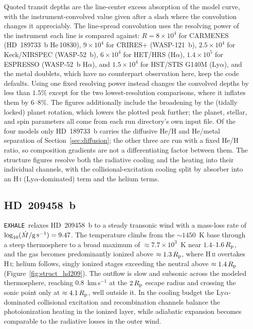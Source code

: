 \documentclass[twocolumn]{aastex702}
\newcommand{\EXHALE}{\texttt{EXHALE}}
\newcommand{\Rp}{R_{\rm p}}
\newcommand{\Mdot}{\dot{M}}
\newcommand{\Lya}{\mbox{Ly}\ensuremath{\alpha}}
\newcommand{\Ha}{\mbox{H}\ensuremath{\alpha}}
\begin{document}
Quoted transit depths are the line-center excess absorption of the model curve, with the
instrument-convolved value given after a slash where the convolution changes it
appreciably. The line-spread convolution uses the resolving power of the instrument each
line is compared against: $R=8\times10^{4}$ for CARMENES (HD~189733~b
\mbox{He\,10830}), $9\times10^{4}$ for CRIRES$+$ (WASP-121~b), $2.5\times10^{4}$ for
Keck/NIRSPEC (WASP-52~b), $6\times10^{4}$ for HET/HRS (\Ha), $1.4\times10^{5}$ for
ESPRESSO (WASP-52~b \Ha), and $1.5\times10^{4}$ for HST/STIS G140M (\Lya), and the
metal doublets, which have no counterpart observation here, keep the code defaults. Using
one fixed resolving power instead changes the convolved depths by less than $1.5\%$
except for the two lowest-resolution comparisons, where it inflates them by $6$--$8\%$.
The figures additionally include the broadening by the (tidally locked)
planet rotation, which lowers the plotted peak further; the planet, stellar, and spin
parameters all come from each run directory's own input file. Of the four models only
HD~189733~b carries the diffusive He/H and He/metal separation of
Section~\ref{sec:diffusion}; the other three are run with a fixed He/H ratio, so
composition gradients are not a differentiating factor between them. The structure figures
resolve both the radiative cooling and the heating into their individual channels, with
the collisional-excitation cooling split by absorber into an \mbox{H\,\textsc{i}}
(\Lya-dominated) term and the helium terms.

\subsection{HD~209458~b}
\label{sec:hd209}

\EXHALE\ relaxes HD~209458~b to a steady transonic wind with a mass-loss rate of
$\log_{10}(\Mdot/{\rm g\,s^{-1}})=9.47$. The temperature climbs from the $\sim1450$~K base
through a steep thermosphere to a broad maximum of $\approx7.7\times10^{3}$~K near
$1.4$--$1.6\,\Rp$, and the gas becomes predominantly ionized above $\approx1.3\,\Rp$, where
\mbox{H\,\textsc{ii}} overtakes \mbox{H\,\textsc{i}}; helium follows, singly ionized
stages exceeding the neutral above $\approx1.4\,\Rp$ (Figure~\ref{fig:struct_hd209}). The outflow is slow and subsonic across the modeled
thermosphere, reaching $0.8$~km\,s$^{-1}$ at the $2\,\Rp$ escape radius and crossing the
sonic point only at $\approx4.1\,\Rp$, well outside it. In the cooling budget the
\Lya-dominated collisional excitation and recombination channels balance the
photoionization heating in the ionized layer, while adiabatic expansion becomes comparable
to the radiative losses in the outer wind.
\end{document}
